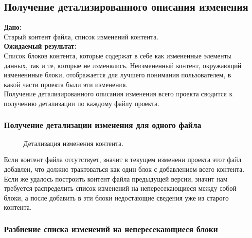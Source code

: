 \documentclass[a4paper,14pt]{extreport} %
\begin{document}
\newpage
\subsection{Получение детализированного описания изменения} 
\textbf{Дано:} \\
Старый контент файла, список изменений контента. \\
\textbf{Ожидаемый результат:} \\
Список блоков контента, которые содержат в себе как измененные элементы данных, так и те, которые не изменялись. Неизмененный контент, окружающий измененнные блоки, отображается для лучшего понимания пользователем, в какой части проекта были эти изменения. \\
Получение детализированного описания изменения всего проекта сводится к получению детализации по каждому файлу проекта.

\subsubsection{Получение детализации изменения для одного файла}

\begin{figure}[H]
\caption{Детализация изменения контента.}
\label{detalized-changes}
\end{figure}
Если контент файла отсутствует, значит в текущем изменени проекта этот файл добавлен, что должно трактоваться как один блок с добавлением всего контента. Если же удалось построить контент файла предыдущей версии, значит нам требуется распределить список изменений на непересекающиеся между собой блоки, а после добавить в эти блоки недостающие сведения уже из старого контента.

\newpage
\subsubsection{Разбиение списка изменений на непересекающиеся блоки}
\end{document}
